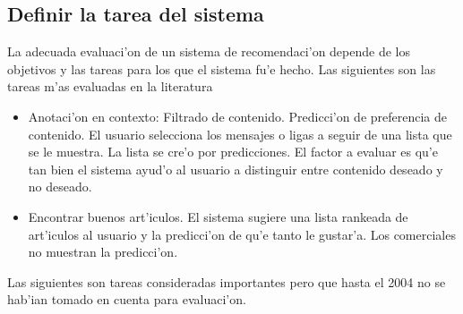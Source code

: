 \documentclass[11pt]{article}
\begin{document}
\subsection{Definir la tarea del sistema}
La adecuada evaluaci'on de un sistema de recomendaci'on depende de los objetivos y las tareas para los que el sistema fu'e hecho. Las siguientes son las tareas m'as evaluadas en la literatura
\begin{itemize}
\item Anotaci'on en contexto: Filtrado de contenido. Predicci'on de preferencia de contenido. El usuario selecciona los mensajes o ligas a seguir de una lista que se le muestra. La lista se cre'o por predicciones. El factor a evaluar es qu'e tan bien el sistema ayud'o al usuario a distinguir entre contenido deseado y no deseado.
\item Encontrar buenos art'iculos. El sistema sugiere una lista rankeada de art'iculos al usuario y la predicci'on de qu'e tanto le gustar'a. Los comerciales no muestran la predicci'on.
\end{itemize}

Las siguientes son tareas consideradas importantes pero que hasta el 2004 no se hab'ian tomado en cuenta para evaluaci'on.
\end{document}
